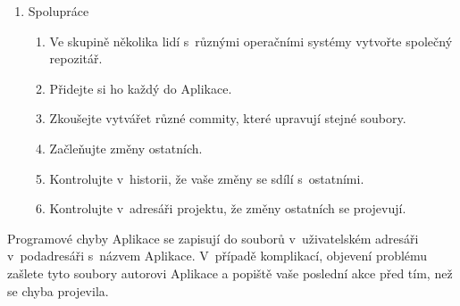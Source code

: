 \begin{enumerate}
\begin{enumerate}
	\end{enumerate}
	\item Spolupráce
	\begin{enumerate}
		\item Ve skupině několika lidí s~různými operačními systémy vytvořte společný repozitář.
		\item Přidejte si ho každý do Aplikace.
		\item Zkoušejte vytvářet různé commity, které upravují stejné soubory.
		\item Začleňujte změny ostatních.
		\item Kontrolujte v~historii, že vaše změny se sdílí s~ostatními.
		\item Kontrolujte v~adresáři projektu, že změny ostatních se projevují.
	\end{enumerate}
\end{enumerate}

Programové chyby Aplikace se zapisují do souborů v~uživatelském adresáři v~podadresáři s~názvem Aplikace. V~případě komplikací, objevení problému zašlete tyto soubory autorovi Aplikace a popiště vaše poslední akce před tím, než se chyba projevila.